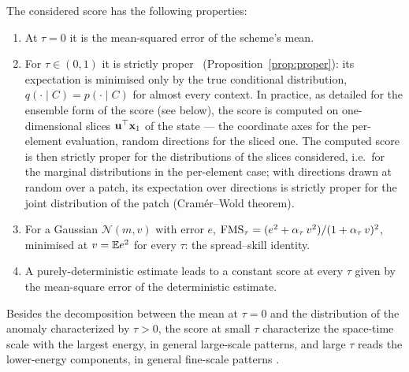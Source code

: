 The considered score has the following properties:
\begin{enumerate}[label=(\roman*),leftmargin=*,nosep]
  \item At $\tau = 0$ it is the mean-squared error of the scheme's mean.
  \item For $\tau \in (0,1)$ it is strictly proper~\cite{gneiting_strictly_2007} (Proposition~\ref{prop:proper}): its  expectation is minimised only by the true conditional distribution,  $q(\cdot \mid C) = p(\cdot \mid C)$ for almost every context. In practice, as  detailed for the ensemble form of the score (see below), the score is computed on one-dimensional slices $\mathbf{u}^\top\mathbf{x}_1$ of the state --- the
  coordinate axes for the per-element evaluation, random directions for the sliced  one. The computed score is then strictly proper for the distributions of the slices considered, i.e.\ for the marginal distributions in the per-element case; with directions drawn at random over a patch, its expectation over directions is strictly proper for the joint distribution of the patch (Cramér--Wold theorem).
  \item For a Gaussian $\mathcal{N}(m, v)$ with error $e$, $\mathrm{FMS}_\tau = (e^2 +
    \alpha_\tau\, v^2)/(1 + \alpha_\tau\, v)^2$, minimised at $v = \mathbb{E} e^2$ for every $\tau$:
    the spread--skill identity.
  \item A purely-deterministic estimate leads to a constant score at every $\tau$ given by the mean-square error of the deterministic estimate.
\end{enumerate}
Besides the decomposition between the mean at $\tau =0$ and the distribution of the anomaly characterized by $\tau >0$, the score at small $\tau$ characterize the space-time scale with the largest energy, in general large-scale patterns, and large $\tau$ reads the lower-energy components, in general fine-scale patterns \cite{rissanen_generative_2022,kadkhodaie_generalization_2024}.

